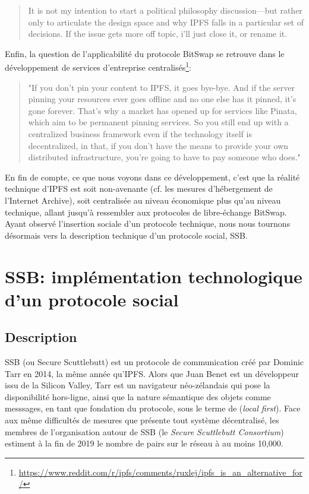 \documentclass{article}
\begin{document}
\begin{quote}
    It is not my intention to start a political philosophy discussion—but rather only to articulate the design space and why IPFS falls in a particular set of decisions. If the issue gets more off topic, i'll just close it, or rename it.\cite{benet_editingdeletion_2017}
\end{quote}

Enfin, la question de l'applicabilité du protocole BitSwap se retrouve dans le développement de services d'entreprise centralisés\footnote{\url{https://www.reddit.com/r/ipfs/comments/ruxlej/ipfs_is_an_alternative_for/}}:

\begin{quote}
    "If you don't pin your content to IPFS, it goes bye-bye. And if the server pinning your resources ever goes offline and no one else has it pinned, it's gone forever. That's why a market has opened up for services like Pinata, which aim to be permanent pinning services. So you still end up with a centralized business framework even if the technology itself is decentralized, in that, if you don't have the means to provide your own distributed infrastructure, you're going to have to pay someone who does." 
\end{quote}

En fin de compte, ce que nous voyons dans ce développement, c'est que la réalité technique d'IPFS est soit non-avenante (cf. les mesures d'hébergement de l'Internet Archive), soit centralisée au niveau économique plus qu'au niveau technique, allant jusqu'à ressembler aux protocoles de libre-échange BitSwap. Ayant observé l'insertion sociale d'un protocole technique, nous nous tournons désormais vers la description technique d'un protocole social, SSB.

\section{SSB: implémentation technologique d'un protocole social}

\subsection{Description}

SSB (ou Secure Scuttlebutt) est un protocole de communication créé par Dominic Tarr en 2014, la même année qu'IPFS. Alors que Juan Benet est un développeur issu de la Silicon Valley, Tarr est un navigateur néo-zélandais qui pose la disponibilité hors-ligne, ainsi que la nature sémantique des objets comme messsages, en tant que fondation du protocole, sous le terme de (\emph{local first}). Face aux même difficultés de mesures que présente tout système décentralisé, les membres de l'organisation autour de SSB (le \emph{Secure Scuttlebutt Consortium}) estiment à la fin de 2019 le nombre de pairs sur le réseau à au moins 10,000\cite{fiscella_35c3_2018}.
\end{document}
